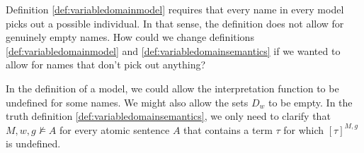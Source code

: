


\begin{exercise}
  Definition \ref{def:variabledomainmodel} requires that every name in every
  model picks out a possible individual. In that sense, the definition does not
  allow for genuinely empty names. How could we change definitions
  \ref{def:variabledomainmodel} and \ref{def:variabledomainsemantics} if we
  wanted to allow for names that don't pick out anything?
\end{exercise}
\begin{solution}
  In the definition of a model, we could allow the interpretation function to be
  undefined for some names. We might also allow the sets $D_{w}$ to be empty. In
  the truth definition \ref{def:variabledomainsemantics}, we only need to
  clarify that $M,w,g \not\models A$ for every atomic sentence $A$ that contains a
  term $\tau$ for which $[\tau]^{M,g}$ is undefined.
\end{solution}


